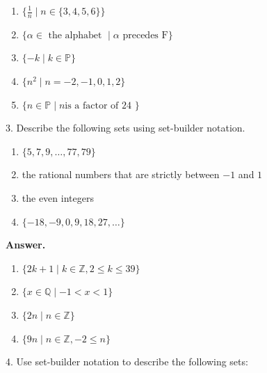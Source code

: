 \documentclass[10pt,]{book}
\theoremstyle{plain}
\theoremstyle{definition}
\theoremstyle{definition}
\theoremstyle{definition}
\theoremstyle{definition}
\numberwithin{equation}{section}
\begin{document}
\begin{exercisegroup}
\begin{enumerate}[label=\alph*]
\item\hypertarget{li-25}{} \(\{\frac{1}{n} \mid n \in \{3,4,5,6\}\}\)%
\item\hypertarget{li-26}{}  \(\{\alpha \in  \textrm{ the alphabet } \mid  \alpha \textrm{ precedes F}\}\)%
\item\hypertarget{li-27}{} \(\{-k \mid k \in \mathbb{P}\}\)%
\item\hypertarget{li-28}{} \(\{n^2 \mid  n = -2, -1, 0, 1, 2\}\)%
\item\hypertarget{li-29}{} \(\{n \in  \mathbb{P} \mid n \textrm{is a  factor of  24 }\}\)%
\end{enumerate}
%
\par\smallskip
\item[3.]\hypertarget{exercise-3}{}  Describe the following sets using set-builder notation. %
\par
\leavevmode%
\begin{multicols}{1}
\begin{enumerate}[label=\alph*]
\item\hypertarget{li-30}{} \(\{ 5, 7, 9, \dots , 77, 79\}\) %
\item\hypertarget{li-31}{}the rational numbers that are strictly between \(-1\) and \(1\) %
\item\hypertarget{li-32}{} the even integers%
\item\hypertarget{li-33}{} \(\{-18, -9,0,9, 18,27, \dots \}\) %
\end{enumerate}
\end{multicols}
%
\par\smallskip
\par\smallskip
\noindent\textbf{Answer.}\hypertarget{answer-2}{}\quad
\leavevmode%
\begin{enumerate}[label=\alph*]
\item\hypertarget{li-34}{} \(\{2k + 1 \mid k \in  \mathbb{Z}, 2 \leqslant  k \leqslant  39\}\) %
\item\hypertarget{li-35}{} \(\{x \in \mathbb{Q}\mid  -1 < x < 1\}\)%
\item\hypertarget{li-36}{} \(\{2n\mid n \in  \mathbb{Z}\}\) %
\item\hypertarget{li-37}{} \(\{9n\mid n \in \mathbb{Z}, -2 \leq  n\}\)%
\end{enumerate}
%
\item[4.]\hypertarget{exercise-4}{}  Use set-builder notation to describe the following sets: %
\par
\leavevmode%
\begin{multicols}{1}
\begin{enumerate}[label=\alph*]

\end{enumerate}
\end{multicols}
\end{exercisegroup}
\end{document}
